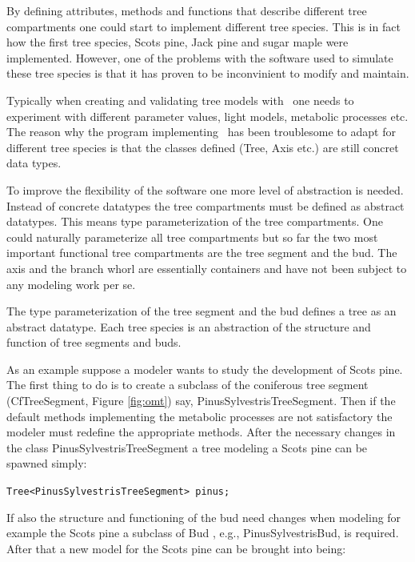 By defining attributes,  methods and functions that describe different
tree compartments  one    could start  to  implement  different   tree
species. This is in fact how the first  tree species, Scots pine, Jack
pine and  sugar maple were implemented.  However,  one of the problems
with the software  used to simulate these  tree species is that it has
proven to  be  inconvinient to   modify  and maintain.   

Typically when creating and validating tree models with \lignum\ one
needs to experiment with different parameter values, light models,
metabolic processes etc.  The reason why the program implementing
\lignum\ has been troublesome to adapt for different tree species is
that the classes defined (Tree, Axis etc.)  are still concret data
types.

To  improve  the  flexibility  of   the software  one   more level  of
abstraction  is  needed.   Instead of  concrete    datatypes the  tree
compartments must be defined  as  abstract datatypes. This  means type
parameterization of  the    tree compartments.  One  could   naturally
parameterize all tree  compartments but so far  the two most important
functional tree  compartments are the tree segment   and the bud.  The
axis and the branch whorl are essentially containers and have not been
subject to any modeling work per se.

The type  parameterization of the tree  segment and the bud  defines a
tree as an abstract datatype.  Each tree  species is an abstraction of
the structure and  function of tree segments  and buds.  

As  an  example suppose a  modeler wants  to  study the development of
Scots  pine.  The first  thing to  do is to   create a subclass of the
coniferous   tree segment  (CfTreeSegment, Figure  \ref{fig:omt}) say, 
PinusSylvestrisTreeSegment.  Then if  the default methods implementing
the metabolic processes are not satisfactory the modeler must redefine
the appropriate  methods.  After the  necessary  changes in the  class
PinusSylvestrisTreeSegment a tree modeling a Scots pine can be spawned
simply:

\begin{center}
\tt Tree<PinusSylvestrisTreeSegment> pinus;\rm
\end{center}

If  also the structure and  functioning of the  bud  need changes when
modeling  for  example  the Scots pine  a   subclass of   Bud  , e.g.,
PinusSylvestrisBud, is required.  After that a new model for the Scots
pine can be brought into being:

